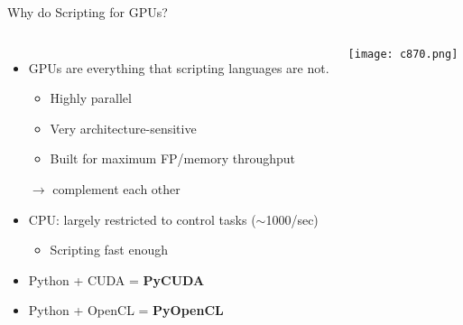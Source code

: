 \begin{frame}{Why do Scripting for GPUs?}
  \begin{columns}
    \begin{itemize}
      \item GPUs are everything that scripting languages are not.
        \begin{itemize}
          \item Highly parallel
          \item Very architecture-sensitive
          \item Built for maximum FP/memory throughput
        \end{itemize}
        $\rightarrow$ complement each other
      \item CPU: largely restricted to control tasks ($\sim$1000/sec)
        \begin{itemize}
          \item Scripting fast enough
        \end{itemize}
      \item Python + CUDA = \textbf{PyCUDA}
      \item Python + OpenCL = \textbf{PyOpenCL}
    \end{itemize}
      \texttt{[image: c870.png]}
  \end{columns}
\end{frame}


